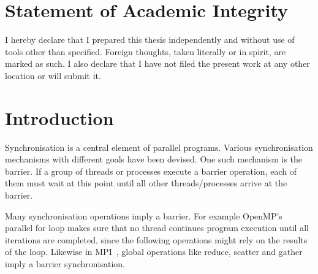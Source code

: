 \documentclass[a4paper, 10pt]{article}
\newcommand*\cleartooddpage{
	\clearpage
	\ifthenelse{\isodd{\thepage}}
		{}
		{\newpage \mbox{} \clearpage}
}
\begin{document}
\section*{Statement of Academic Integrity}
\label{sec:integrity}
I hereby declare that I prepared this thesis independently and without use of tools other than specified. Foreign thoughts, taken literally or in spirit, are marked as such. I also declare that I have not filed the present work at any other location or will submit it.

\pagebreak
\newpage \thispagestyle{empty} \mbox{}
\pagebreak


\renewcommand{\contentsname}{Contents}
\tableofcontents

\pagebreak
\newpage \mbox{}
\pagebreak


\cleartooddpage
\section{Introduction}
\label{sec:introduction}
Synchronisation is a central element of parallel programs. Various synchronisation mechanisms with different goals have been devised. One such mechanism is the barrier. If a group of threads or processes execute a barrier operation, each of them must wait at this point until all other threads/processes arrive at the barrier.

Many synchronisation operations imply a barrier. For example OpenMP's~\cite{openmp} parallel for loop makes sure that no thread continues program execution until all iterations are completed, since the following operations might rely on the results of the loop. Likewise in MPI~\cite{mpiforum}, global operations like reduce, scatter and gather imply a barrier synchronisation.
\end{document}
